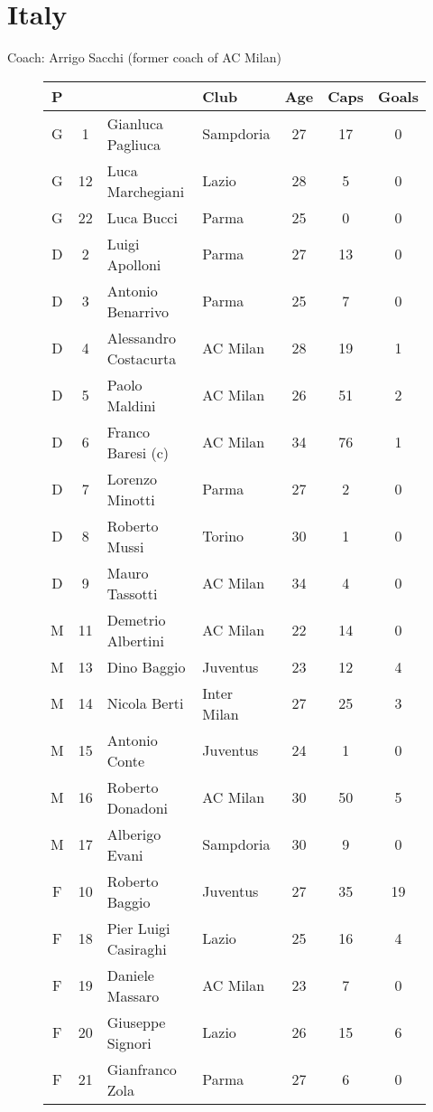 \chapter{Italy}
\newline
\newline
Coach: Arrigo Sacchi (former coach of AC Milan)
\begin{figure}[H]
\begin{tabular}{c c l l c c c}
P & & & Club & Age & Caps & Goals \\ \hline
G & 1 & Gianluca Pagliuca & Sampdoria & 27 & 17 & 0 \\
G & 12 & Luca Marchegiani & Lazio & 28 & 5 & 0 \\
G & 22 & Luca Bucci & Parma & 25 & 0 & 0 \\ \hline
D & 2 & Luigi Apolloni & Parma & 27 & 13 & 0 \\
D & 3 & Antonio Benarrivo & Parma & 25 & 7 & 0 \\
D & 4 & Alessandro Costacurta & AC Milan & 28 & 19 & 1 \\
D & 5 & Paolo Maldini & AC Milan & 26 & 51 & 2 \\
D & 6 & Franco Baresi (c) & AC Milan & 34 & 76 & 1 \\
D & 7 & Lorenzo Minotti & Parma & 27 & 2 & 0 \\
D & 8 & Roberto Mussi & Torino & 30 & 1 & 0 \\
D & 9 & Mauro Tassotti & AC Milan & 34 & 4 & 0 \\ \hline
M &11 & Demetrio Albertini & AC Milan & 22 & 14 & 0 \\
M &13 & Dino Baggio & Juventus & 23 & 12 & 4 \\
M &14 & Nicola Berti & Inter Milan & 27 & 25 & 3 \\
M &15 & Antonio Conte & Juventus & 24 & 1 & 0 \\
M &16 & Roberto Donadoni & AC Milan & 30 & 50 & 5 \\
M &17 & Alberigo Evani & Sampdoria & 30 & 9 & 0 \\ \hline
F & 10 & Roberto Baggio & Juventus & 27 & 35 & 19 \\
F & 18 & Pier Luigi Casiraghi & Lazio & 25 & 16 & 4 \\
F & 19 & Daniele Massaro & AC Milan & 23 & 7 & 0 \\
F & 20 & Giuseppe Signori & Lazio & 26 & 15 & 6 \\
F & 21 & Gianfranco Zola & Parma & 27 & 6 & 0 \\ \hline
\end{tabular}
\end{figure}
